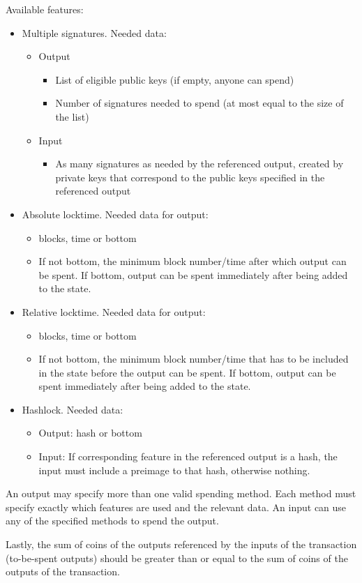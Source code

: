 Available features:
\begin{itemize}
  \item Multiple signatures. Needed data:
  \begin{itemize}
    \item Output
    \begin{itemize}
      \item List of eligible public keys (if empty, anyone can spend)
      \item Number of signatures needed to spend (at most equal to the size of the
      list)
    \end{itemize}
    \item Input
    \begin{itemize}
      \item As many signatures as needed by the referenced output, created by
      private keys that correspond to the public keys specified in the
      referenced output
    \end{itemize}
  \end{itemize}
  \item Absolute locktime. Needed data for output:
  \begin{itemize}
    \item blocks, time or bottom
    \item If not bottom, the minimum block number/time after which output can be
    spent. If bottom, output can be spent immediately after being added to the
    state.
  \end{itemize}
  \item Relative locktime. Needed data for output:
  \begin{itemize}
    \item blocks, time or bottom
    \item If not bottom, the minimum block number/time that has to be included
    in the state before the output can be spent. If bottom, output can be spent
    immediately after being added to the state.
  \end{itemize}
  \item Hashlock. Needed data:
  \begin{itemize}
    \item Output: hash or bottom
    \item Input: If corresponding feature in the referenced output is a hash,
    the input must include a preimage to that hash, otherwise nothing.
  \end{itemize}
\end{itemize}

An output may specify more than one valid spending method. Each method must
specify exactly which features are used and the relevant data. An input can use
any of the specified methods to spend the output.

Lastly, the sum of coins of the outputs referenced by the inputs of the
transaction (to-be-spent outputs) should be greater than or equal to the sum of
coins of the outputs of the transaction.
